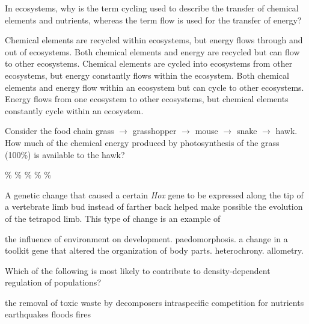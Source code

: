 \question
In ecosystems, why is the term cycling used to describe the transfer of chemical elements and nutrients, whereas the term flow is used for the transfer of energy?

\begin{choices}
\correctchoice Chemical elements are recycled within ecosystems, but energy flows through and out of ecosystems.%
\choice Both chemical elements and energy are recycled but can flow to other ecosystems.%
\choice Chemical elements are cycled into ecosystems from other ecosystems, but energy constantly flows within the ecosystem.%
\choice Both chemical elements and energy flow within an ecosystem but can cycle to other ecosystems.%
\choice Energy flows from one ecosystem to other ecosystems, but chemical elements constantly cycle within an ecosystem.%
\end{choices}


\question
Consider the food chain grass $\to$ grasshopper $\to$ mouse $\to$ snake $\to$ hawk. How much of the chemical energy produced by photosynthesis of the grass (100\%) is available to the hawk?

\begin{choices}
\%%
\%%
\%%
\%%
\%%
\end{choices}

\question
A genetic change that caused a certain \textit{Hox} gene to be expressed along the tip of a vertebrate limb bud instead of farther back helped make possible the  evolution of the tetrapod limb. This type of change is an example of 
\begin{choices}
\choice the influence of environment on development.%
\choice paedomorphosis.%
\correctchoice a change in a toolkit gene that altered the organization of body parts.%
\choice heterochrony.%
\choice allometry.%
\end{choices}

\question
Which of the following is most likely to contribute to density-dependent regulation of populations?

\begin{choices}
\choice the removal of toxic waste by decomposers%
\correctchoice intraspecific competition for nutrients%
\choice earthquakes%
\choice floods%
\choice fires%
\end{choices}

